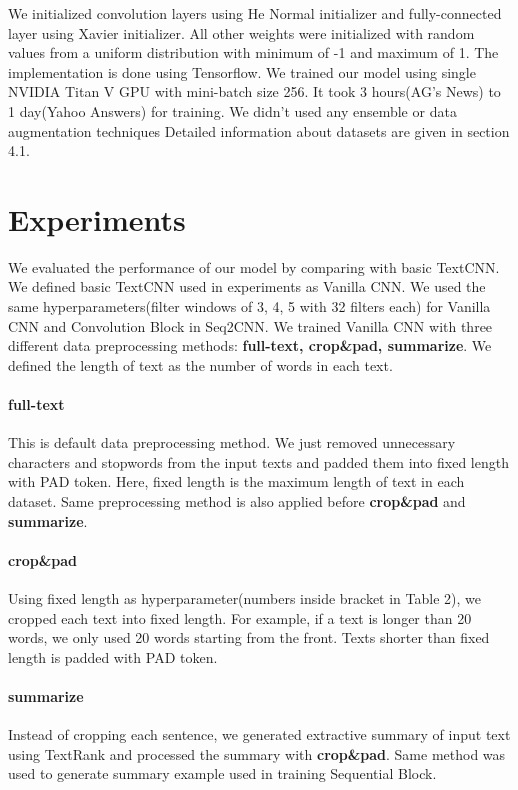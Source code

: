 \documentclass{article}
\begin{document}
We initialized convolution layers using He Normal\cite{DBLP:journals/corr/HeZR015} initializer and fully-connected layer using Xavier\cite{pmlr-v9-glorot10a} initializer. All other weights were initialized with random values from a uniform distribution with minimum of -1 and maximum of 1. The implementation is done using Tensorflow\cite{tensorflow2015-whitepaper}. We trained our model using single NVIDIA Titan V GPU with mini-batch size 256. It took 3 hours(AG’s News) to 1 day(Yahoo Answers) for training. We didn't used any ensemble or data augmentation techniques Detailed information about datasets are given in section 4.1.

\section{Experiments}
We evaluated the performance of our model by comparing with basic TextCNN\cite{DBLP:journals/corr/Kim14f}. We defined basic TextCNN used in experiments as Vanilla CNN. We used the same hyperparameters(filter windows of 3, 4, 5 with 32 filters each) for Vanilla CNN and Convolution Block in Seq2CNN. We trained Vanilla CNN with three different data preprocessing methods: \textbf{full-text, crop\&pad, summarize}. We defined the length of text as the number of words in each text. 
\paragraph{full-text}
This is default data preprocessing method. We just removed unnecessary characters and stopwords from the input texts and padded them into fixed length with PAD token. Here, fixed length is the maximum length of text in each dataset. Same preprocessing method is also applied before \textbf{crop\&pad} and \textbf{summarize}.
\paragraph{crop\&pad}
Using fixed length as hyperparameter(numbers inside bracket in Table 2), we cropped each text into fixed length. For example, if a text is longer than 20 words, we only used 20 words starting from the front. Texts shorter than fixed length is padded with PAD token.
\paragraph{summarize}
Instead of cropping each sentence, we generated extractive summary of input text using TextRank\cite{mihalcea-tarau:2004:EMNLP} and processed the summary with \textbf{crop\&pad}. Same method was used to generate summary example used in training Sequential Block.  
\end{document}
